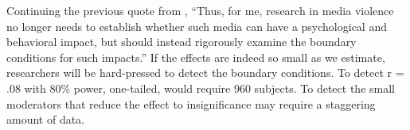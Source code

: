 \documentclass[man]{apa6}
\begin{document}
Continuing the previous quote from \citet[p. 62]{Warburton:2014}, %
``Thus, for me, research in media violence no longer needs to establish whether such media can have a psychological and behavioral impact, but should instead rigorously examine the boundary conditions for such impacts.'' If the effects are indeed so small as we estimate, researchers will be hard-pressed to detect the boundary conditions. To detect r = .08 with 80\% power, one-tailed, would require 960 subjects. To detect the small moderators that reduce the effect to insignificance may require a staggering amount of data.



\newpage


\end{document}
